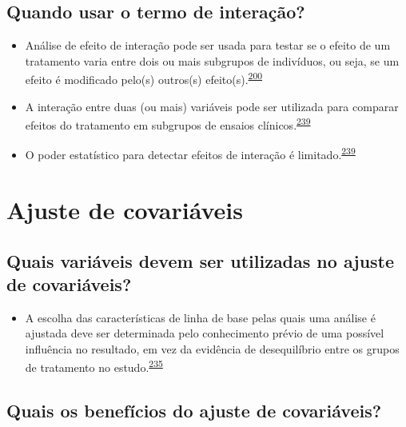 \documentclass[
  a4paper,
]{book}
\providecommand{\tightlist}{%
  \setlength{\itemsep}{0pt}\setlength{\parskip}{0pt}}
\begin{document}
\hypertarget{quando-usar-o-termo-de-interauxe7uxe3o}{%
\subsection{Quando usar o termo de interação?}\label{quando-usar-o-termo-de-interauxe7uxe3o}}

\begin{itemize}
\item
  Análise de efeito de interação pode ser usada para testar se o efeito de um tratamento varia entre dois ou mais subgrupos de indivíduos, ou seja, se um efeito é modificado pelo(s) outros(s) efeito(s).\textsuperscript{\protect\hyperlink{ref-Altman1996}{200}}
\item
  A interação entre duas (ou mais) variáveis pode ser utilizada para comparar efeitos do tratamento em subgrupos de ensaios clínicos.\textsuperscript{\protect\hyperlink{ref-Altman2003}{239}}
\item
  O poder estatístico para detectar efeitos de interação é limitado.\textsuperscript{\protect\hyperlink{ref-Altman2003}{239}}
\end{itemize}

\hypertarget{ajuste-de-covariaveis}{%
\section{Ajuste de covariáveis}\label{ajuste-de-covariaveis}}

\hypertarget{quais-variuxe1veis-devem-ser-utilizadas-no-ajuste-de-covariuxe1veis}{%
\subsection{Quais variáveis devem ser utilizadas no ajuste de covariáveis?}\label{quais-variuxe1veis-devem-ser-utilizadas-no-ajuste-de-covariuxe1veis}}

\begin{itemize}
\tightlist
\item
  A escolha das características de linha de base pelas quais uma análise é ajustada deve ser determinada pelo conhecimento prévio de uma possível influência no resultado, em vez da evidência de desequilíbrio entre os grupos de tratamento no estudo.\textsuperscript{\protect\hyperlink{ref-roberts1999}{235}}
\end{itemize}

\hypertarget{quais-os-benefuxedcios-do-ajuste-de-covariuxe1veis}{%
\subsection{Quais os benefícios do ajuste de covariáveis?}\label{quais-os-benefuxedcios-do-ajuste-de-covariuxe1veis}}
\end{document}
